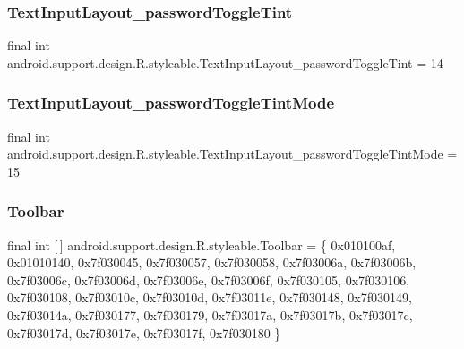 \subsubsection{\texorpdfstring{Text\+Input\+Layout\+\_\+password\+Toggle\+Tint}{TextInputLayout\_passwordToggleTint}}
{\footnotesize\ttfamily final int android.\+support.\+design.\+R.\+styleable.\+Text\+Input\+Layout\+\_\+password\+Toggle\+Tint = 14\hspace{0.3cm}{\ttfamily [static]}}

\mbox{\label{classandroid_1_1support_1_1design_1_1R_1_1styleable_aafbf1a87eadb8c4597771e237a0ca57b}} 
\subsubsection{\texorpdfstring{Text\+Input\+Layout\+\_\+password\+Toggle\+Tint\+Mode}{TextInputLayout\_passwordToggleTintMode}}
{\footnotesize\ttfamily final int android.\+support.\+design.\+R.\+styleable.\+Text\+Input\+Layout\+\_\+password\+Toggle\+Tint\+Mode = 15\hspace{0.3cm}{\ttfamily [static]}}

\mbox{\label{classandroid_1_1support_1_1design_1_1R_1_1styleable_a7783ebe780dbe2a845802a40519a46e9}} 
\subsubsection{\texorpdfstring{Toolbar}{Toolbar}}
{\footnotesize\ttfamily final int \mbox{[}$\,$\mbox{]} android.\+support.\+design.\+R.\+styleable.\+Toolbar = \{ 0x010100af, 0x01010140, 0x7f030045, 0x7f030057, 0x7f030058, 0x7f03006a, 0x7f03006b, 0x7f03006c, 0x7f03006d, 0x7f03006e, 0x7f03006f, 0x7f030105, 0x7f030106, 0x7f030108, 0x7f03010c, 0x7f03010d, 0x7f03011e, 0x7f030148, 0x7f030149, 0x7f03014a, 0x7f030177, 0x7f030179, 0x7f03017a, 0x7f03017b, 0x7f03017c, 0x7f03017d, 0x7f03017e, 0x7f03017f, 0x7f030180 \}\hspace{0.3cm}{\ttfamily [static]}}

